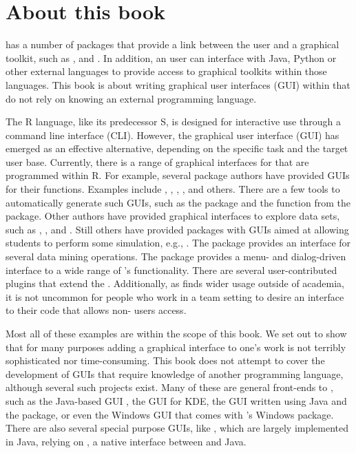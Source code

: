 


\section*{About this book}
\label{sec:about}


\R\/ has a number of packages that provide a link between the \R\/
user and a graphical toolkit, such as ,  and
. In addition, an \R\/ user can interface with
Java, Python or other external languages to provide access to graphical
toolkits within those languages. This book is about writing graphical
user interfaces (GUI) within \R\/ that do not rely on knowing an
external programming language.  

The R language, like its predecessor S, is designed for interactive
use through a command line interface (CLI). However, the graphical
user interface (GUI) has emerged as an effective alternative,
depending on the specific task and the target user base. Currently,
there is a range of graphical interfaces for \R\/ that are programmed
within R. For example, several package authors have provided GUIs for
their functions. Examples include , ,
, , and others. There are a
few tools to automatically generate such GUIs, such as the 
package and the  function from the
 package. Other authors have provided graphical
interfaces to explore data sets, such as , ,
 and . Still others have provided packages
with GUIs aimed at allowing students to perform some simulation, e.g.,
. The  package provides an interface
for several data mining operations. The  package provides a
menu- and dialog-driven interface to a wide range of \R's
functionality. There are several user-contributed plugins that extend
the . Additionally, as \R\/ finds wider usage outside of
academia, it is not uncommon for people who work in a team setting to
desire an interface to their \R\/ code that allows non-\R\/ users
access.

Most all of these examples are within the scope of this book. We set out to
show that for many purposes adding a graphical interface to one's work
is not terribly sophisticated nor time-consuming.  This book does not
attempt to cover the development of GUIs that require knowledge of
another programming language, although several such projects
exist. Many of these are general front-ends to \R\/, such as the
Java-based GUI , the  GUI for KDE, the
 GUI written using Java and the  package, or
even the Windows GUI that comes with \R's Windows package. There are
also several special purpose GUIs, like , which are
largely implemented in Java, relying on , a native
interface between \R\/ and Java.

